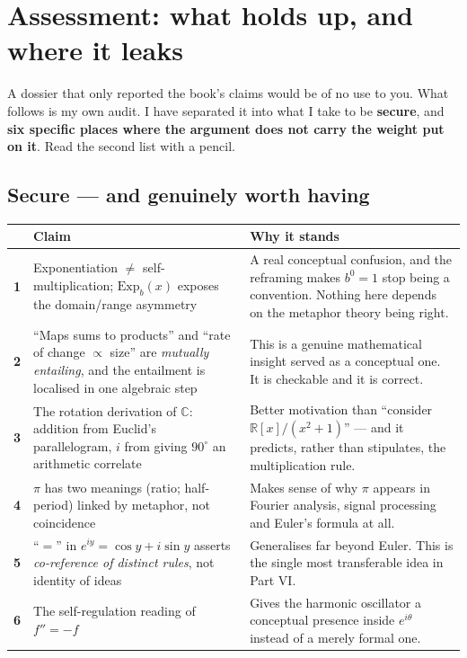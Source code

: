\clearpage
\renewcommand{\sectioncolor}{crimson}
\section{Assessment: what holds up, and where it leaks}\label{sec:audit}

A dossier that only reported the book's claims would be of no use to you. What follows is my own
audit. I have separated it into what I take to be \textbf{secure}, and \textbf{six specific places
where the argument does not carry the weight put on it}. Read the second list with a pencil.

\subsection{Secure --- and genuinely worth having}

\begin{center}\small
\begin{tabular}{@{}>{\raggedright\arraybackslash}p{0.7cm}>{\raggedright\arraybackslash}p{6.35cm}>{\raggedright\arraybackslash}p{9.4cm}@{}}
\toprule
\rowcolor{moss!14}
& \textbf{\color{moss}Claim} & \textbf{\color{moss}Why it stands}\\
\midrule
\textbf{1} & Exponentiation $\neq$ self-multiplication; $\mathrm{Exp}_b(x)$ exposes the domain/range
  asymmetry & A real conceptual confusion, and the reframing makes $b^0=1$ stop being a convention.
  Nothing here depends on the metaphor theory being right.\\
\textbf{2} & ``Maps sums to products'' and ``rate of change $\propto$ size'' are \emph{mutually
  entailing}, and the entailment is localised in one algebraic step &
  This is a genuine mathematical insight served as a conceptual one. It is checkable and it is correct.\\
\textbf{3} & The rotation derivation of $\mathbb{C}$: addition from Euclid's parallelogram, $i$ from
  giving $90^{\circ}$ an arithmetic correlate &
  Better motivation than ``consider $\mathbb{R}[x]/(x^2+1)$'' --- and it predicts, rather than
  stipulates, the multiplication rule.\\
\textbf{4} & $\pi$ has two meanings (ratio; half-period) linked by metaphor, not coincidence &
  Makes sense of why $\pi$ appears in Fourier analysis, signal processing and Euler's formula at all.\\
\rowcolor{moss!6}
\textbf{5} & ``$=$'' in $e^{iy}=\cos y+i\sin y$ asserts \emph{co-reference of distinct rules}, not
  identity of ideas & Generalises far beyond Euler. This is the single most transferable idea in
  Part VI.\\
\rowcolor{moss!6}
\textbf{6} & The self-regulation reading of $f''=-f$ & Gives the harmonic oscillator a conceptual
  presence inside $e^{i\theta}$ instead of a merely formal one.\\
\bottomrule
\end{tabular}
\end{center}

